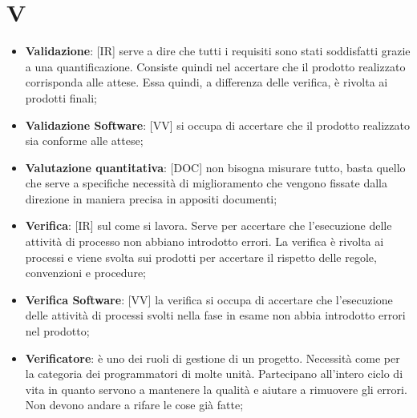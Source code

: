 %
%
%

\section{V}

\begin{itemize}
	\item \textbf{Validazione}: [IR] serve a dire che tutti i requisiti sono stati soddisfatti grazie a una quantificazione. Consiste quindi nel accertare che il prodotto realizzato corrisponda alle attese. Essa quindi, a differenza delle verifica, è rivolta ai prodotti finali;

	\item \textbf{Validazione Software}: [VV] si occupa di accertare che il prodotto realizzato sia conforme alle attese;

	\item \textbf{Valutazione quantitativa}: [DOC] non bisogna misurare tutto, basta quello che serve a specifiche necessità di miglioramento che vengono fissate dalla direzione in maniera precisa in appositi documenti;

	\item \textbf{Verifica}: [IR] sul come si lavora. Serve per accertare che l'esecuzione delle attività di processo non abbiano introdotto errori. La verifica è rivolta ai processi e viene svolta sui prodotti per accertare il rispetto delle regole, convenzioni e procedure;

	\item \textbf{Verifica Software}: [VV] la verifica si occupa di accertare che l'esecuzione delle attività di processi svolti nella fase in esame non abbia introdotto errori nel prodotto;


	\item \textbf{Verificatore}: è uno dei ruoli di gestione di un progetto. Necessità come per la categoria dei programmatori di molte unità. Partecipano all'intero ciclo di vita in quanto servono a mantenere la qualità e aiutare a rimuovere gli errori. Non devono andare a rifare le cose già fatte;

\end{itemize}